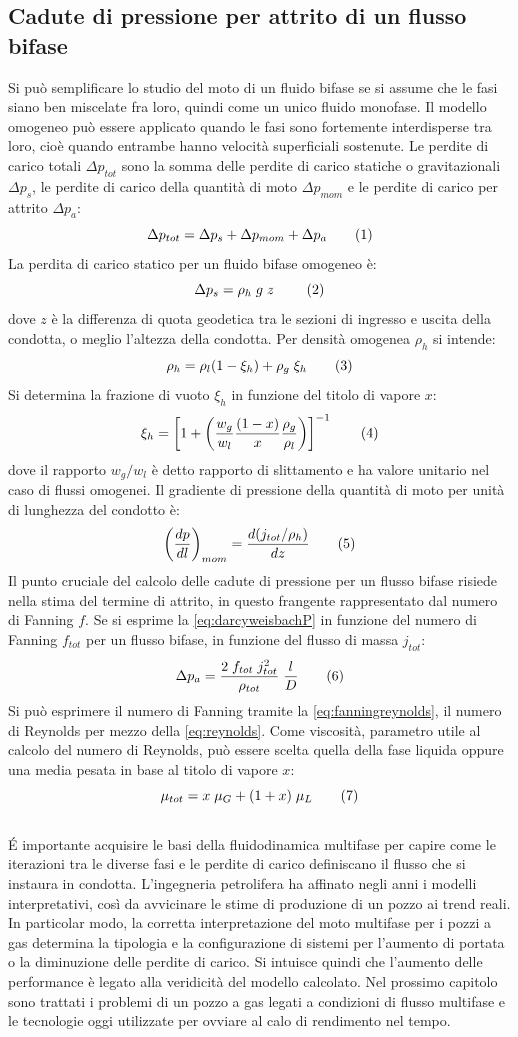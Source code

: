 \subsection{Cadute di pressione per attrito di un flusso bifase}
Si può semplificare lo studio del moto di un fluido bifase se si assume che le fasi siano ben miscelate fra loro, quindi come un unico fluido monofase. Il modello omogeneo può essere applicato quando le fasi sono fortemente interdisperse tra loro, cioè quando entrambe hanno velocità superficiali sostenute. Le perdite di carico totali \(\Delta p_{tot}\) sono la somma delle perdite di carico statiche o gravitazionali \(\Delta p_s\), le perdite di carico della quantità di moto \(\Delta p_{mom}\) e le perdite di carico per attrito \(\Delta p_a\): 
\[\Delta p_{tot} = \Delta p_s +\Delta p_{mom} + \Delta p_a \addtag \label{eq:perditetot}\]
La perdita di carico statico per un fluido bifase omogeneo è:
\[\Delta p_s = \rho_h \; g \; z\ \addtag \]
dove \(z\) è la differenza di quota geodetica tra le sezioni di ingresso e uscita della condotta, o meglio l'altezza della condotta. Per densità omogenea \(\rho_h\) si intende:
\[\rho_h=\rho_l(1-\xi_h)+\rho_g \; \xi_h \addtag \label{eq:omogenea} \]
Si determina la frazione di vuoto \(\xi_h\) in funzione del titolo di vapore \(x\):
\[\xi_h = \left[ 1+ \left( \dfrac{w_g}{w_l} \dfrac{(1-x)}{x} \dfrac{\rho_g}{\rho_l} \right) \right]^{-1} \addtag \]
dove il rapporto \(w_g/w_l\) è detto rapporto di slittamento e ha valore unitario nel caso di flussi omogenei. Il gradiente di pressione della quantità di moto per unità di lunghezza del condotto è:
\[\left( \dfrac{dp}{dl} \right)_{mom}=\dfrac{d(j_{tot}/\rho_h)}{dz} \addtag \]
Il punto cruciale del calcolo delle cadute di pressione per un flusso bifase risiede nella stima del termine di attrito, in questo frangente rappresentato dal numero di Fanning \(f\). Se si esprime la \eqref{eq:darcyweisbachP} in funzione del numero di Fanning \(f_{tot}\) per un flusso bifase, in funzione del flusso di massa \(j_{tot}\):
\[\Delta p_a = \dfrac{2 \; f_{tot} \; j_{tot}^2}{\rho_{tot}} \; \dfrac{l}{D} \addtag \label{eq:darcyweisbachfanning2f} \]
Si può esprimere il numero di Fanning tramite la \eqref{eq:fanningreynolds}, il numero di Reynolds per mezzo della \eqref{eq:reynolds}. Come viscosità, parametro utile al calcolo del numero di Reynolds, può essere scelta quella della fase liquida oppure una media pesata in base al titolo di vapore \(x\):
\[\mu_{tot} =x \; \mu_G + (1+x) \; \mu_L \addtag \]
\\
\'E importante acquisire le basi della fluidodinamica multifase per capire come le iterazioni tra le diverse fasi e le perdite di carico definiscano il flusso che si instaura in condotta. L'ingegneria petrolifera ha affinato negli anni i modelli interpretativi, così da avvicinare le stime di produzione di un pozzo ai trend reali. In particolar modo, la corretta interpretazione del moto multifase per i pozzi a gas determina la tipologia e la configurazione di sistemi per l'aumento di portata o la diminuzione delle perdite di carico. Si intuisce quindi che l'aumento delle performance è legato alla veridicità del modello calcolato. Nel prossimo capitolo sono trattati i problemi di un pozzo a gas legati a condizioni di flusso multifase e le tecnologie oggi utilizzate per ovviare al calo di rendimento nel tempo.
